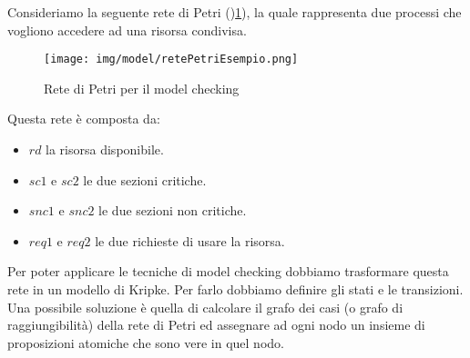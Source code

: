 \begin{esempio}
    Consideriamo la seguente rete di Petri ()\ref{fig:retePetriEsempio}), la
    quale rappresenta due processi che vogliono accedere ad una risorsa condivisa.
    \begin{figure}
        \centering
        \texttt{[image: img/model/retePetriEsempio.png]}
        \caption{Rete di Petri per il model checking}
        \label{fig:retePetriEsempio}
    \end{figure}
    Questa rete è composta da:
    \begin{itemize}
        \item $rd$ la risorsa disponibile.
        \item $sc1$ e $sc2$ le due sezioni critiche.
        \item $snc1$ e $snc2$ le due sezioni non critiche.
        \item $req1$ e $req2$ le due richieste di usare la risorsa.
    \end{itemize}
    Per poter applicare le tecniche di model checking dobbiamo trasformare questa
    rete in un modello di Kripke. Per farlo dobbiamo definire gli stati e le
    transizioni. Una possibile soluzione è quella di calcolare il grafo dei casi
    (o grafo di raggiungibilità) della rete di Petri ed assegnare ad ogni nodo
    un insieme di proposizioni atomiche che sono vere in quel nodo.


\end{esempio}
